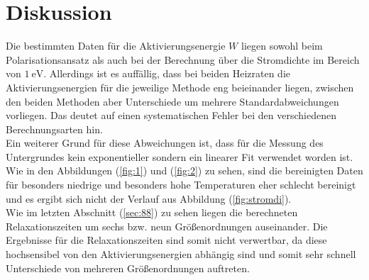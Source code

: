 \section{Diskussion}
\label{sec:Diskussion}
Die bestimmten Daten für die Aktivierungsenergie $W$ liegen sowohl beim Polarisationsansatz als auch bei der Berechnung über die Stromdichte im Bereich von $\SI{1}{\electronvolt}$. Allerdings ist es auffällig, dass bei
beiden Heizraten die Aktivierungsenergien für die jeweilige Methode eng beieinander liegen, zwischen den beiden Methoden aber Unterschiede um mehrere Standardabweichungen vorliegen. Das deutet auf einen systematischen Fehler bei den verschiedenen Berechnungsarten hin.\\ Ein weiterer Grund für diese Abweichungen ist, dass für die Messung des Untergrundes kein exponentieller sondern ein linearer Fit verwendet worden ist. Wie in den
Abbildungen (\ref{fig:1}) und (\ref{fig:2}) zu sehen, sind die bereinigten Daten für besonders niedrige und besonders hohe Temperaturen eher schlecht bereinigt und es ergibt sich nicht der Verlauf aus Abbildung (\ref{fig:stromdi}).\\
Wie im letzten Abschnitt (\ref{sec:88}) zu sehen liegen die berechneten Relaxationszeiten um sechs bzw. neun Größenordnungen auseinander. Die Ergebnisse für die Relaxationszeiten sind somit nicht verwertbar, da diese hochsensibel von den Aktivierungsenergien abhängig sind und somit sehr schnell Unterschiede von mehreren Größenordnungen auftreten. 
